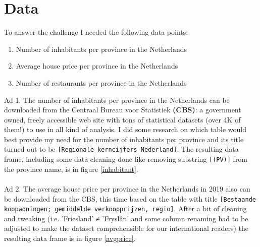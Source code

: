 \section{Data}
To answer the challenge I needed the following data points:
\medskip
\begin{enumerate}
  \item Number of inhabitants per province in the Netherlands
  \item Average house price per province in the Netherlands
  \item Number of restaurants per province in the Netherlands
\end{enumerate}
\medskip
Ad 1. The number of inhabitants per province in the Netherlands can be downloaded from the Centraal Bureau voor Statistiek \textbf{(CBS)}: a government owned, freely accessible web site with tons of statistical datasets (over 4K of them!) to use in all kind of analysis. I did some research on which table would best provide my need for the number of inhabitants per province and its title turned out to be \texttt{[Regionale kerncijfers Nederland]}. The resulting data frame, including some data cleaning done like removing substring \texttt{[(PV)]} from the province name, is in figure \ref{inhabitant}.  
\\\\
Ad 2. The average house price per province in the Netherlands in 2019 also can be downloaded from the CBS, this time based on the table with title \texttt{[Bestaande koopwoningen; gemiddelde verkoopprijzen, regio]}. After a bit of cleaning and tweaking (i.e. 'Friesland' ≠ 'Fryslân' and some column renaming had to be adjusted to make the dataset comprehensible for our international readers) the resulting data frame is in figure \ref{avgprice}.
\\\\
